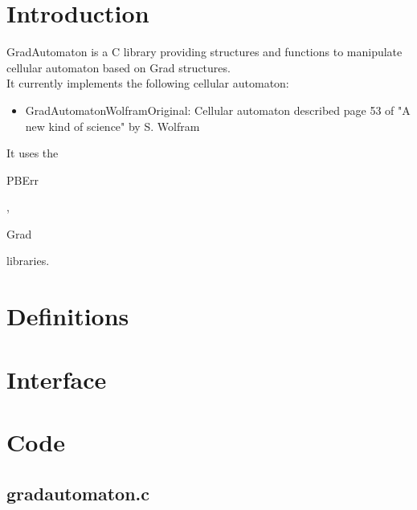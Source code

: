 \section*{Introduction}

GradAutomaton is a C library providing structures and functions to manipulate cellular automaton based on Grad structures.\\

It currently implements the following cellular automaton:\\
\begin{itemize}
\item GradAutomatonWolframOriginal: Cellular automaton described page 53 of "A new kind of science" by S. Wolfram
\end{itemize}

It uses the \begin{ttfamily}PBErr\end{ttfamily}, \begin{ttfamily}Grad\end{ttfamily} libraries.\\

\section{Definitions}


\section{Interface}

\begin{scriptsize}
\begin{ttfamily}

\end{ttfamily}
\end{scriptsize}

\section{Code}

\subsection{gradautomaton.c}

\begin{scriptsize}
\begin{ttfamily}

\end{ttfamily}
\end{scriptsize}


